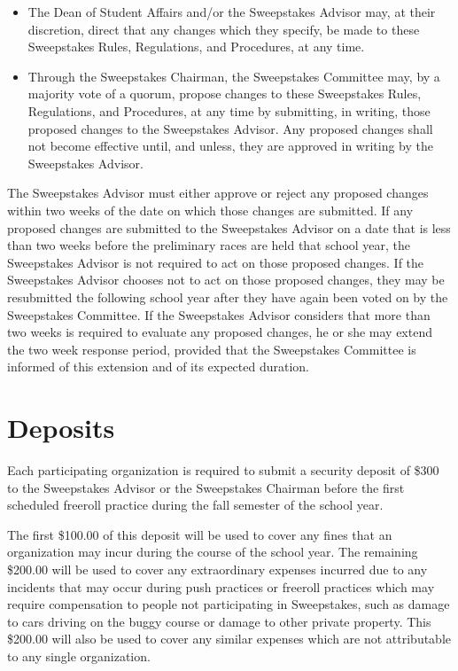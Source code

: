 	\begin{itemize}

		\item
		The Dean of Student Affairs and/or the Sweepstakes Advisor may, at their discretion, direct that any changes which they specify, be made to these Sweepstakes Rules, Regulations, and Procedures, at any time.

		\item
		Through the Sweepstakes Chairman, the Sweepstakes Committee may, by a majority vote of a quorum, propose changes to these Sweepstakes Rules, Regulations, and Procedures, at any time by submitting, in writing, those proposed changes to the Sweepstakes Advisor. Any proposed changes shall not become effective until, and unless, they are approved in writing by the Sweepstakes Advisor.

	\end{itemize}

	The Sweepstakes Advisor must either approve or reject any proposed changes within two weeks of the date on which those changes are submitted. If any proposed changes are submitted to the Sweepstakes Advisor on a date that is less than two weeks before the preliminary races are held that school year, the Sweepstakes Advisor is not required to act on those proposed changes. If the Sweepstakes Advisor chooses not to act on those proposed changes, they may be resubmitted the following school year after they have again been voted on by the Sweepstakes Committee. If the Sweepstakes Advisor considers that more than two weeks is required to evaluate any proposed changes, he or she may extend the two week response period, provided that the Sweepstakes Committee is informed of this extension and of its expected duration.

\section{Deposits}
\label{Deposits}

	Each participating organization is required to submit a security deposit of \$300 to the Sweepstakes Advisor or the Sweepstakes Chairman before the first scheduled freeroll practice during the fall semester of the school year.

	The first \$100.00 of this deposit will be used to cover any fines that an organization may incur during the course of the school year. The remaining \$200.00 will be used to cover any extraordinary expenses incurred due to any incidents that may occur during push practices or freeroll practices which may require compensation to people not participating in Sweepstakes, such as damage to cars driving on the buggy course or damage to other private property. This \$200.00 will also be used to cover any similar expenses which are not attributable to any single organization.

